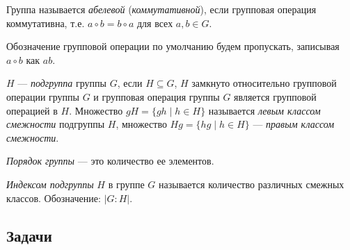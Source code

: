 Группа называется \textit{абелевой} (\textit{коммутативной}), если групповая операция коммутативна, т.е. $a\circ b=b\circ a$ для всех $a,b\in G$.

Обозначение групповой операции по умолчанию будем пропускать, записывая $a\circ b$ как $ab$.

$H$ --- \textit{подгруппа} группы $G$, если $H\subseteq G$, $H$ замкнуто относительно групповой операции группы $G$ и групповая операция группы $G$ является групповой операцией в $H$. Множество $gH=\{gh\mid h\in H\}$ называется \textit{левым классом смежности} подгруппы $H$, множество $Hg=\{hg\mid h\in H\}$ --- \textit{правым классом смежности}.

\textit{Порядок группы} --- это количество ее элементов.

\textit{Индексом подгруппы} $H$ в группе $G$ называется количество различных смежных классов. Обозначение: $|G:H|$.

\subsection*{Задачи}


